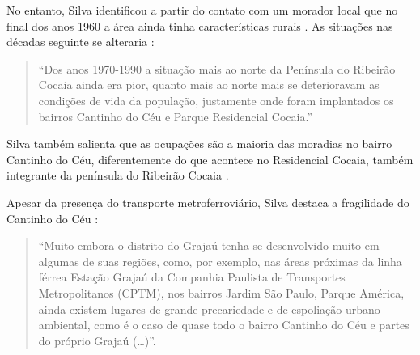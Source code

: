 \documentclass[hidelinks,a4paper,nofootinbib,aps,reprint,superscriptaddress,twocolumn]{revtex4}
\begin{document}
	No entanto, Silva identificou a partir do contato com um morador local que no final dos anos 1960 a área ainda tinha características rurais \cite[p.80]{Silva2016}. As situações nas décadas seguinte se alteraria \cite[p.82]{Silva2016}:
	
	\begin{quote}
		``Dos anos 1970-1990 a situação mais ao norte da Península do Ribeirão Cocaia ainda era pior, quanto mais ao norte mais se deterioravam as condições de vida da população, justamente onde foram implantados os bairros Cantinho do Céu e Parque Residencial Cocaia.''
	\end{quote}
	
	Silva também salienta que as ocupações são a maioria das moradias no bairro Cantinho do Céu, diferentemente do que acontece no Residencial Cocaia, também integrante da península do Ribeirão Cocaia \cite[p.83]{Silva2016}.
	
	Apesar da presença do transporte metroferroviário, Silva destaca a fragilidade do Cantinho do Céu \cite[p.98]{Silva2016}:
	
	\begin{quote}
		``Muito embora o distrito do Grajaú tenha se desenvolvido muito em algumas de suas regiões, como, por exemplo, nas áreas próximas da linha férrea Estação Grajaú da Companhia Paulista de Transportes Metropolitanos (CPTM), nos bairros Jardim São Paulo, Parque América, ainda existem lugares de grande	precariedade e de espoliação urbano-ambiental, como é o caso de quase todo o bairro Cantinho do Céu e partes do próprio Grajaú (\dots)''.
	\end{quote}

	
	
	
\end{document}
